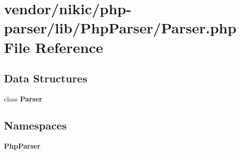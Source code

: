 \section{vendor/nikic/php-\/parser/lib/\+Php\+Parser/\+Parser.php File Reference}
\label{nikic_2php-parser_2lib_2_php_parser_2_parser_8php}
\subsection*{Data Structures}
\begin{DoxyCompactItemize}
\item 
class {\bf Parser}
\end{DoxyCompactItemize}
\subsection*{Namespaces}
\begin{DoxyCompactItemize}
\item 
 {\bf Php\+Parser}
\end{DoxyCompactItemize}
